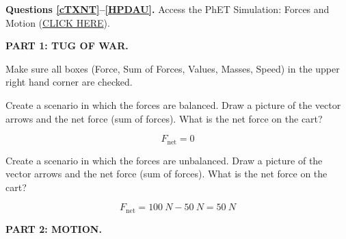 \documentclass[answers]{exam}
\begin{document}
\textbf{Questions \ref{cTXNT}--\ref{HPDAU}.} Access the PhET Simulation: Forces and Motion (\href{https://phet.colorado.edu/sims/html/forces-and-motion-basics/latest/forces-and-motion-basics_all.html}{CLICK HERE}).

\textbf{PART 1: TUG OF WAR.} 



Make sure all boxes (Force, Sum of Forces, Values, Masses, Speed) in the upper right hand corner are checked.

\begin{questions}

\question \label{cTXNT}
Create a scenario in which the forces are balanced. Draw a picture of the vector arrows and the net force (sum of forces). What is the net force on the cart? 

\begin{solution}
\begin{center}

\begin{equation*}
    F_\mathrm{net} = 0
\end{equation*}
\end{center}
\end{solution}

\question
Create a scenario in which the forces are unbalanced. Draw a picture of the vector arrows and the net force (sum of forces). What is the net force on the cart?

\begin{solution}
\begin{center}

\begin{equation*}
    F_\mathrm{net} = \SI{100}{N} - \SI{50}{N} = \SI{50}{N}
\end{equation*}

\end{center}
\end{solution}


\begin{EnvUplevel}
    \textbf{PART 2: MOTION.} 
    

\end{EnvUplevel}
\end{questions}
\end{document}
